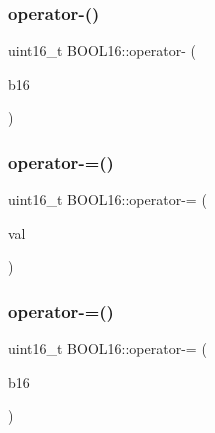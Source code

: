 \hypertarget{struct_b_o_o_l16_a0c74b8b86a62ddadbc40d39ca74b35a6}{}\label{struct_b_o_o_l16_a0c74b8b86a62ddadbc40d39ca74b35a6} 
\subsubsection{\texorpdfstring{operator-\/()}{operator-()}\hspace{0.1cm}{\footnotesize\ttfamily [2/2]}}
{\footnotesize\ttfamily uint16\+\_\+t B\+O\+O\+L16\+::operator-\/ (\begin{DoxyParamCaption}\item[{const \hyperlink{struct_b_o_o_l16}{B\+O\+O\+L16}}]{b16 }\end{DoxyParamCaption})\hspace{0.3cm}{\ttfamily [inline]}}

\hypertarget{struct_b_o_o_l16_a9cb670916112ed0a5ef6387e5a029e17}{}\label{struct_b_o_o_l16_a9cb670916112ed0a5ef6387e5a029e17} 
\subsubsection{\texorpdfstring{operator-\/=()}{operator-=()}\hspace{0.1cm}{\footnotesize\ttfamily [1/2]}}
{\footnotesize\ttfamily uint16\+\_\+t B\+O\+O\+L16\+::operator-\/= (\begin{DoxyParamCaption}\item[{const uint16\+\_\+t}]{val }\end{DoxyParamCaption})\hspace{0.3cm}{\ttfamily [inline]}}

\hypertarget{struct_b_o_o_l16_a734895715c8196113269c604d8d543be}{}\label{struct_b_o_o_l16_a734895715c8196113269c604d8d543be} 
\subsubsection{\texorpdfstring{operator-\/=()}{operator-=()}\hspace{0.1cm}{\footnotesize\ttfamily [2/2]}}
{\footnotesize\ttfamily uint16\+\_\+t B\+O\+O\+L16\+::operator-\/= (\begin{DoxyParamCaption}\item[{const \hyperlink{struct_b_o_o_l16}{B\+O\+O\+L16}}]{b16 }\end{DoxyParamCaption})\hspace{0.3cm}{\ttfamily [inline]}}

